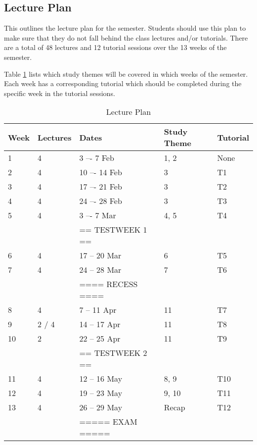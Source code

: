     \subsection{Lecture Plan}
        This outlines the lecture plan for the semester. Students should use
        this plan to make sure that they do not fall behind the class
        lectures and/or tutorials. There are a total of 48 lectures and 12
        tutorial sessions over the 13 weeks of the semester.

        Table \ref{tab:lec_plan} lists which study themes will be covered
        in which weeks of the semester. Each week has a corresponding tutorial
        which should be completed during the specific week in the tutorial
        sessions.

        \begin{table}[!h]
            \begin{center}
             \begin{tabular}{|l|l|l|l|l|}
                 \hline
                 {\bf Week} & {\bf Lectures} & {\bf Dates} & %
                 {\bf Study Theme} & {\bf Tutorial} \\
                 \hline
                 1  & 4     &  3 –-  7 Feb     & 1, 2  & None \\
                 2  & 4     & 10 –- 14 Feb     & 3     & T1 \\
                 3  & 4     & 17 –- 21 Feb     & 3     & T2 \\
                 4  & 4     & 24 –- 28 Feb     & 3     & T3 \\
                 5  & 4     &  3 –-  7 Mar     & 4, 5  & T4 \\
                    &       & == TESTWEEK 1 == &       & \\
                 6  & 4     & 17 -- 20 Mar     & 6     & T5 \\
                 7  & 4     & 24 -- 28 Mar     & 7     & T6 \\
                    &       & ==== RECESS ==== &       & \\
                 8  & 4     &  7 -- 11 Apr     & 11    & T7 \\
                 9  & 2 / 4 & 14 -- 17 Apr     & 11    & T8 \\
                 10 & 2     & 22 -- 25 Apr     & 11    & T9 \\
                    &       & == TESTWEEK 2 == &       & \\
                 11 & 4     & 12 -- 16 May     & 8, 9  & T10 \\
                 12 & 4     & 19 -- 23 May     & 9, 10 & T11 \\
                 13 & 4     & 26 -- 29 May     & Recap & T12 \\
                    &       & ===== EXAM ===== &       & \\
                 \hline
             \end{tabular}
             \caption{Lecture Plan} \label{tab:lec_plan}
            \end{center}
        \end{table}

